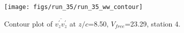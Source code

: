 \begin{figure}[H]
\centering
\texttt{[image: figs/run\_35/run\_35\_ww\_contour]}
\caption{Contour plot of $\overline{v_{z}^{\prime} v_{z}^{\prime}}$ at $z/c$=8.50, $V_{free}$=23.29, station 4.}
\label{fig:run_35_ww_contour}
\end{figure}


